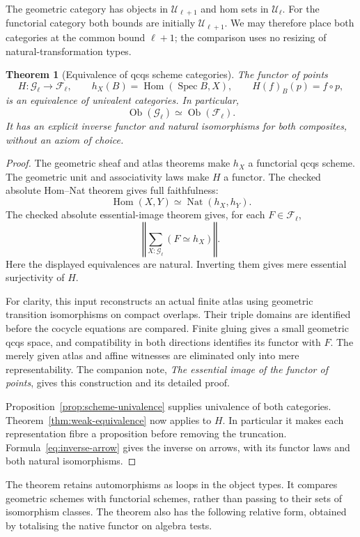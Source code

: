 \documentclass[11pt]{amsart}
\newtheorem{theorem}{Theorem}[section]
\theoremstyle{definition}
\theoremstyle{remark}
\newcommand{\UU}{\mathcal U}
\newcommand{\Hom}{\operatorname{Hom}}
\newcommand{\Nat}{\operatorname{Nat}}
\newcommand{\Ob}{\operatorname{Ob}}
\newcommand{\tr}[1]{\left\Vert #1\right\Vert}
\begin{document}
The geometric category has objects in $\UU_{\ell+1}$ and hom sets in
$\UU_\ell$. For the functorial category both bounds are initially
$\UU_{\ell+1}$. We may therefore place both categories at the common
bound $\ell+1$; the comparison uses no resizing of natural-transformation
types.

\begin{theorem}[Equivalence of qcqs scheme categories]
\label{thm:qcqs-comparison}
The functor of points
\[
 H:\mathcal G_\ell\longrightarrow\mathcal F_\ell,\qquad
 h_X(B)=\Hom(\operatorname{Spec}B,X),\qquad
 H(f)_B(p)=f\circ p,
\]
is an equivalence of univalent categories. In particular,
\[
 \Ob(\mathcal G_\ell)\simeq\Ob(\mathcal F_\ell).
\]
It has an explicit inverse functor and natural isomorphisms for both
composites, without an axiom of choice.
\end{theorem}
\begin{proof}
The geometric sheaf and atlas theorems make $h_X$ a functorial qcqs
scheme. The geometric unit and associativity laws make $H$ a functor.
The checked absolute Hom--Nat theorem gives full faithfulness:
\[
 \Hom(X,Y)\simeq\Nat(h_X,h_Y).
\]
The checked absolute essential-image theorem gives, for each
$F\in\mathcal F_\ell$,
\[
 \tr{\sum_{X:\mathcal G_\ell}(F\simeq h_X)}.
\]
Here the displayed equivalences are natural. Inverting them gives mere
essential surjectivity of $H$.

For clarity, this input reconstructs an actual finite atlas using
geometric transition isomorphisms on compact overlaps. Their triple
domains are identified before the cocycle equations are compared.
Finite gluing gives a small geometric qcqs space, and compatibility in
both directions identifies its functor with $F$. The merely given
atlas and affine witnesses are eliminated only into mere
representability. The companion note, \emph{The essential image of the
functor of points}, gives this construction and its detailed proof.

Proposition~\ref{prop:scheme-univalence} supplies univalence of both
categories. Theorem~\ref{thm:weak-equivalence} now applies to $H$.
In particular it makes each representation fibre a proposition before
removing the truncation. Formula~\eqref{eq:inverse-arrow} gives the
inverse on arrows, with its functor laws and both natural isomorphisms.
\end{proof}

The theorem retains automorphisms as loops in the object types. It
compares geometric schemes with functorial schemes, rather than passing
to their sets of isomorphism classes. The theorem also has the following
relative form, obtained by totalising the native functor on algebra tests.
\end{document}
